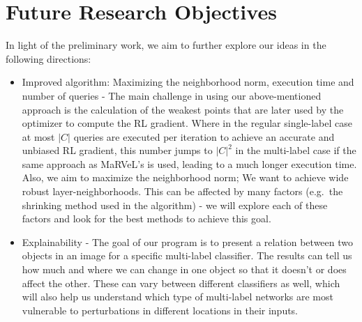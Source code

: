 
\section{Future Research Objectives}
In light of the preliminary work, we aim to further explore our ideas in the following directions:
\begin{itemize}
    \item Improved algorithm: Maximizing the neighborhood norm, execution time and number of queries -
    The main challenge in using our above-mentioned approach is the calculation of the weakest points that are later used by the optimizer to compute the RL gradient.
    Where in the regular single-label case at most $|C|$ queries are executed per iteration to achieve an accurate and unbiased RL gradient, this number jumps to $|C|^2$ in the multi-label case if the same approach as MaRVeL's is used, leading to a much longer execution time.
    Also, we aim to maximize the neighborhood norm;
    We want to achieve wide robust layer-neighborhoods.
    This can be affected by many factors (e.g.\ the shrinking method used in the algorithm) - we will explore each of these factors and look for the best methods to achieve this goal.
    \item Explainability - The goal of our program is to present a relation between two objects in an image for a specific multi-label classifier.
    The results can tell us how much and where we can change in one object so that it doesn't or does affect the other.
    These can vary between different classifiers as well, which will also help us understand which type of multi-label networks are most vulnerable to perturbations in different locations in their inputs.
\end{itemize}
